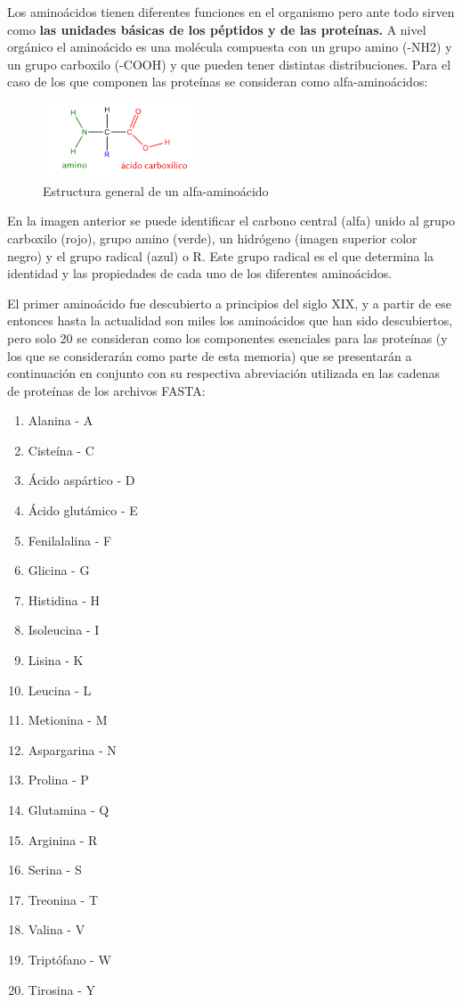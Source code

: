 Los aminoácidos tienen diferentes funciones en el organismo \cite{amino} pero ante todo sirven como \textbf{las unidades básicas de los péptidos y de las proteínas.} A nivel orgánico el aminoácido es una molécula compuesta con un grupo amino (-NH2) y un grupo carboxilo (-COOH) y que pueden tener distintas distribuciones. Para el caso de los que componen las proteínas se consideran como alfa-aminoácidos:

\begin{figure}[h]
    \centering
    \includegraphics[width=0.4\textwidth]{./images/aminoacido}
    \caption{Estructura general de un alfa-aminoácido}
    \label{fig:image3}
\end{figure}

En la imagen anterior se puede identificar el carbono central (alfa) unido al grupo carboxilo (rojo), grupo amino (verde), un hidrógeno (imagen superior color negro) y el grupo radical (azul) o R. Este grupo radical es el que determina la identidad y las propiedades de cada uno de los diferentes aminoácidos.

El primer aminoácido fue descubierto a principios del siglo XIX, y a partir de ese entonces hasta la actualidad son miles los aminoácidos que han sido descubiertos, pero solo 20 se consideran como los componentes esenciales para las proteínas (y los que se considerarán como parte de esta memoria) que se presentarán a continuación en conjunto con su respectiva abreviación utilizada en las cadenas de proteínas de los archivos FASTA:

\begin{enumerate}
\item Alanina - A
\item Cisteína - C
\item Ácido aspártico - D
\item Ácido glutámico - E
\item Fenilalalina - F
\item Glicina - G
\item Histidina - H
\item Isoleucina - I
\item Lisina - K
\item Leucina - L
\item Metionina - M
\item Aspargarina - N
\item Prolina - P
\item Glutamina - Q
\item Arginina - R
\item Serina - S
\item Treonina - T
\item Valina - V
\item Triptófano - W
\item Tirosina - Y
\end{enumerate}

